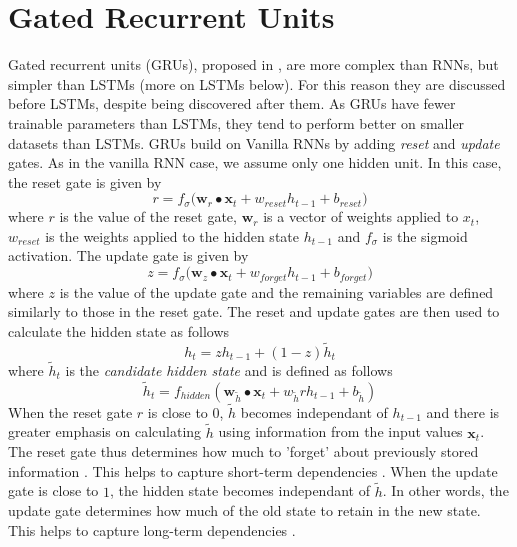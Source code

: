 \documentclass[]{article}
\begin{document}
\section{Gated Recurrent Units}

Gated recurrent units (GRUs), proposed in \cite{DBLP:journals/corr/ChoMGBSB14}, are more complex than RNNs, but simpler than LSTMs (more on LSTMs below). For this reason they are discussed before LSTMs, despite being discovered after them. As GRUs have fewer trainable parameters than LSTMs, they tend to perform better on smaller datasets than LSTMs.
\newline
\newline
GRUs build on Vanilla RNNs by adding \textit{reset} and \textit{update} gates. As in the vanilla RNN case, we assume only one hidden unit. In this case, the reset gate is given by
\begin{equation}
r = f_{\sigma} \bigg( \textbf{w}_{r} \bullet \textbf{x}_{t}  + w_{reset} h_{t-1} + b_{reset}\bigg)
\end{equation}
where $r$ is the value of the reset gate, $\textbf{w}_{r}$ is a vector of weights applied to $x_{t}$, $w_{reset}$ is the weights applied to the hidden state $h_{t-1}$ and $f_{\sigma}$ is the sigmoid activation. The update gate is given by
\begin{equation}
z = f_{\sigma} \bigg( \textbf{w}_{z} \bullet \textbf{x}_{t}  + w_{forget} h_{t-1} + b_{forget}\bigg)
\end{equation}
where $z$ is the value of the update gate and the remaining variables are defined similarly to those in the reset gate.
\newline
\newline
The reset and update gates are then used to calculate the hidden state as follows
\begin{equation}
h_{t} = zh_{t-1} + (1-z) \tilde{h}_{t}
\end{equation}
where $\tilde{h}_{t}$ is the \textit{candidate hidden state} and is defined as follows
\begin{equation}
\tilde{h}_{t} = f_{hidden}(\textbf{w}_{\tilde{h}} \bullet \textbf{x}_{t} + w_{\tilde{h}} r h_{t-1} + b_{\tilde{h}})
\end{equation}
When the reset gate $r$ is close to $0$, $\tilde{h}$ becomes independant of $h_{t-1}$ and there is greater emphasis on calculating $\tilde{h}$ using information from the input values $\textbf{x}_{t}$. The reset gate thus determines how much to 'forget' about previously stored information \cite{DBLP:journals/corr/ChoMGBSB14}. This helps to capture short-term dependencies \cite{zhang-lipton-li-smola}.
\newline
\newline
When the update gate is close to $1$, the hidden state becomes independant of $\tilde{h}$. In other words, the update gate determines how much of the old state to retain in the new state. This helps to capture long-term dependencies \cite{zhang-lipton-li-smola}.
\end{document}
